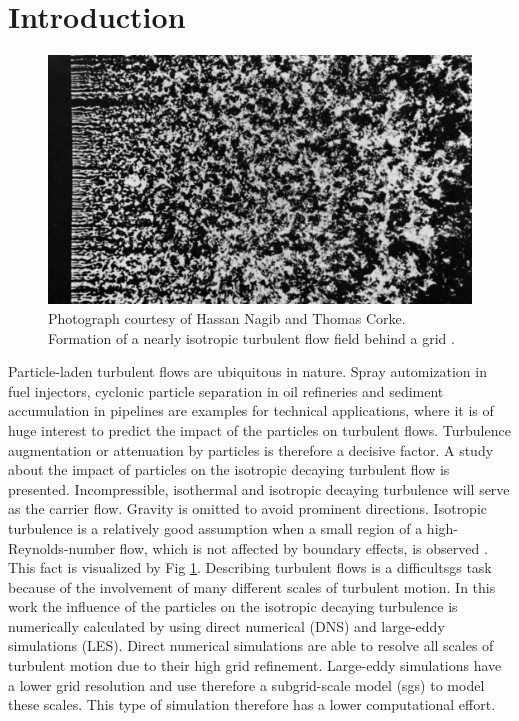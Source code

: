 \documentclass[11pt,a4paper,openany,oneside,parskip=half*]{article}
\begin{document}
\section{Introduction}
\setcounter{page}{1}
\begin{figure}[h]
	\centering
  \includegraphics[width=\textwidth]{./Abbildungen/TurbulentMotion_Introduction.png}
  \captionsetup{width=0.97\linewidth}
	\caption{Photograph courtesy of Hassan Nagib and Thomas Corke. Formation of a nearly isotropic turbulent flow field behind a grid \cite{albumOfFluidMotion}.}
	\label{introduction_picture}
\end{figure}
Particle-laden turbulent flows are ubiquitous in nature.
Spray automization in fuel injectors, cyclonic particle separation in oil refineries and sediment accumulation in pipelines are examples for technical applications, where it is of huge interest to predict the impact of the particles on turbulent flows.
Turbulence augmentation or attenuation by particles is therefore a decisive factor.
\newline
A study about the impact of particles on the isotropic decaying turbulent flow is presented.
Incompressible, isothermal and isotropic decaying turbulence will serve as the carrier flow. Gravity is omitted to avoid prominent directions. Isotropic turbulence is a relatively good assumption when a small region of a high-Reynolds-number flow, which is not affected by boundary effects, is observed \cite{Kolmogorov1941}. This fact is visualized by Fig \ref{introduction_picture}. Describing turbulent flows is a difficultsgs task because of the involvement of many different scales of turbulent motion.
\newline
In this work the influence of the particles on the isotropic decaying turbulence is numerically calculated by using direct numerical (DNS) and large-eddy simulations (LES). Direct numerical simulations are able to resolve all scales of turbulent motion due to their high grid refinement. Large-eddy simulations have a lower grid resolution and use therefore a subgrid-scale model (sgs) to model these scales. This type of simulation therefore has a lower computational effort.
\end{document}
